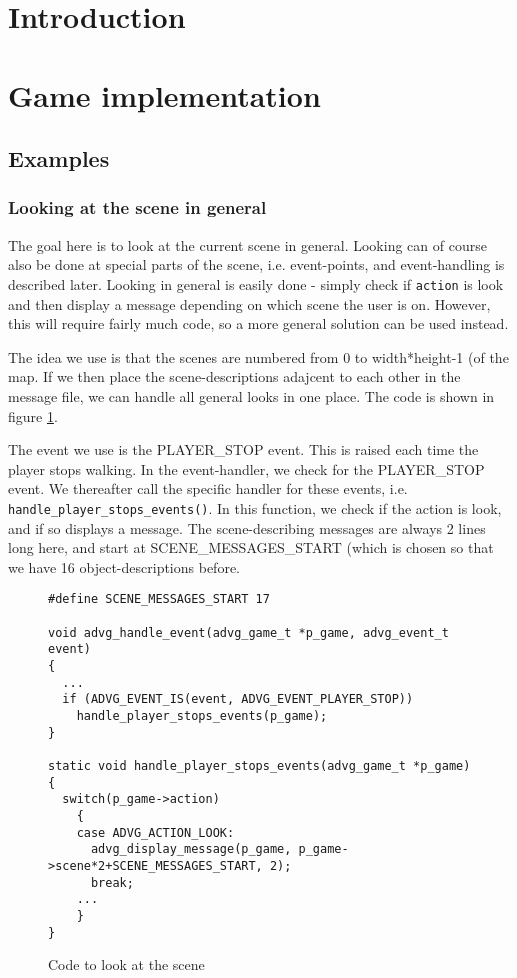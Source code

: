 \documentclass[a4wide]{article}
\begin{document}
\section{Introduction}




\section{Game implementation}

\subsection{Examples}

\subsubsection{Looking at the scene in general}
The goal here is to look at the current scene in general. Looking can of course
also be done at special parts of the scene, i.e. event-points, and
event-handling is described later. Looking in general is easily done - simply
check if \verb&action& is look and then display a message depending on which
scene the user is on. However, this will require fairly much code, so a more
general solution can be used instead.

The idea we use is that the scenes are numbered from 0 to width*height-1 (of the
map. If we then place the scene-descriptions adajcent to each other in the
message file, we can handle all general looks in one place. The code is shown in
figure \ref{fig:look_scene}.

The event we use is the PLAYER\_STOP event. This is raised each time the player
stops walking. In the event-handler, we check for the PLAYER\_STOP event. We
thereafter call the specific handler for these events, i.e.
\verb&handle_player_stops_events()&.  In this function, we check if the action
is look, and if so displays a message. The scene-describing messages are always
2 lines long here, and start at SCENE\_MESSAGES\_START (which is chosen so that
we have 16 object-descriptions before.

\begin{figure}
  \scriptsize
\begin{verbatim}
#define SCENE_MESSAGES_START 17

void advg_handle_event(advg_game_t *p_game, advg_event_t event)
{
  ...
  if (ADVG_EVENT_IS(event, ADVG_EVENT_PLAYER_STOP))
    handle_player_stops_events(p_game);
}

static void handle_player_stops_events(advg_game_t *p_game)
{
  switch(p_game->action)
    {
    case ADVG_ACTION_LOOK:
      advg_display_message(p_game, p_game->scene*2+SCENE_MESSAGES_START, 2);
      break;
    ...
    }
}
\end{verbatim}
  \label{fig:look_scene}
  \caption{Code to look at the scene}
\end{figure}
\end{document}
